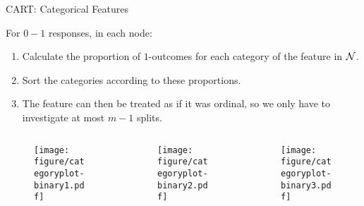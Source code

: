 \documentclass[11pt,compress,t,notes=noshow, xcolor=table]{beamer}
\begin{document}
  \begin{frame}[noframenumbering]{CART: Categorical Features}

For $0-1$ responses, in each node:
  \begin{enumerate}
  \item Calculate the proportion of $1$-outcomes for each category of the feature in $\mathcal{N}$.
  \item Sort the categories according to these proportions.
  \item The feature can then be treated as if it was ordinal, so we only have to investigate at most $m-1$ splits.
  \end{enumerate}
  \begin{columns}
  \begin{column}{0.33\textwidth}
  \begin{figure}
  \texttt{[image: figure/categoryplot-binary1.pdf]} 
  \end{figure}
  \end{column}
  \begin{column}{0.33\textwidth}
  \begin{figure}
  \texttt{[image: figure/categoryplot-binary2.pdf]} 
  \end{figure}
  \end{column}
  \begin{column}{0.33\textwidth}
  \begin{figure}
  \texttt{[image: figure/categoryplot-binary3.pdf]} 
  \end{figure}
  \end{column}
  \end{columns}

\end{frame}
\end{document}
